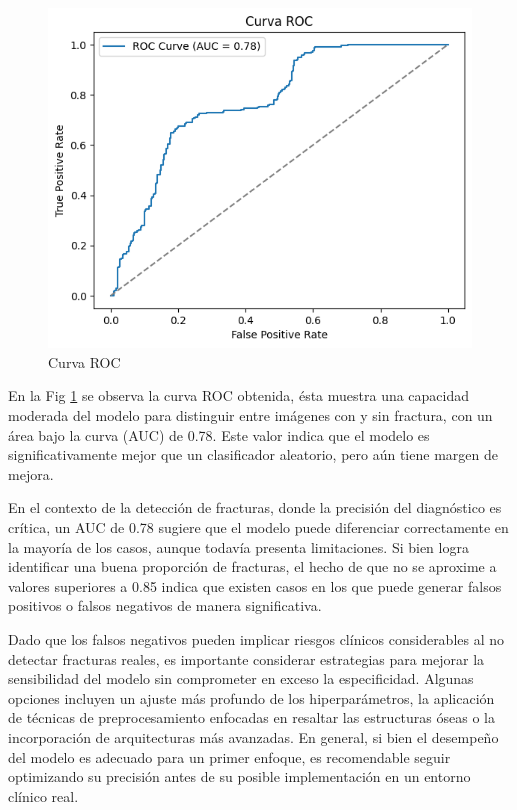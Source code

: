 \documentclass[journal]{IEEEtran}
\begin{document}
\begin{figure}
    \centering
    \includegraphics[width=0.9\linewidth]{Figs/ROC.png}
    \caption{Curva ROC}
    \label{ROC}
\end{figure}

En la Fig \ref{ROC} se observa la curva ROC obtenida, ésta muestra una capacidad moderada del modelo para distinguir entre imágenes con y sin fractura, con un área bajo la curva (AUC) de 0.78. Este valor indica que el modelo es significativamente mejor que un clasificador aleatorio, pero aún tiene margen de mejora.

En el contexto de la detección de fracturas, donde la precisión del diagnóstico es crítica, un AUC de 0.78 sugiere que el modelo puede diferenciar correctamente en la mayoría de los casos, aunque todavía presenta limitaciones. Si bien logra identificar una buena proporción de fracturas, el hecho de que no se aproxime a valores superiores a 0.85 indica que existen casos en los que puede generar falsos positivos o falsos negativos de manera significativa.

Dado que los falsos negativos pueden implicar riesgos clínicos considerables al no detectar fracturas reales, es importante considerar estrategias para mejorar la sensibilidad del modelo sin comprometer en exceso la especificidad. Algunas opciones incluyen un ajuste más profundo de los hiperparámetros, la aplicación de técnicas de preprocesamiento enfocadas en resaltar las estructuras óseas o la incorporación de arquitecturas más avanzadas. En general, si bien el desempeño del modelo es adecuado para un primer enfoque, es recomendable seguir optimizando su precisión antes de su posible implementación en un entorno clínico real.
\end{document}
